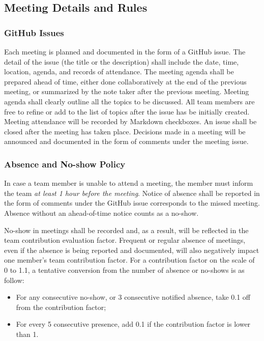 \documentclass{article}
\begin{document}
\subsection{Meeting Details and Rules}

\subsubsection{GitHub Issues}

Each meeting is planned and documented in the form of a GitHub issue. The detail
of the issue (the title or the description) shall include the date, time,
location, agenda, and records of attendance. The meeting agenda shall be
prepared ahead of time, either done collaboratively at the end of the previous
meeting, or summarized by the note taker after the previous meeting. Meeting
agenda shall clearly outline all the topics to be discussed. All team members
are free to refine or add to the list of topics after the issue has be initially
created. Meeting attendance will be recorded by Markdown checkboxes. An issue
shall be closed after the meeting has taken place. Decisions made in a meeting
will be announced and documented in the form of comments under the meeting
issue.

\subsubsection{Absence and No-show Policy}

In case a team member is unable to attend a meeting, the member must inform the
team \emph{at least 1 hour before the meeting}. Notice of absence shall be
reported in the form of comments under the GitHub issue corresponds to the
missed meeting. Absence without an ahead-of-time notice counts as a no-show.

No-show in meetings shall be recorded and, as a result, will be reflected in the
team contribution evaluation factor. Frequent or regular absence of meetings,
even if the absence is being reported and documented, will also negatively
impact one member's team contribution factor. For a contribution factor on the
scale of 0 to 1.1, a tentative conversion from the number of absence or no-shows
is as follow:
\begin{itemize}
\item For any consecutive no-show, or 3 consecutive notified absence, take 0.1 off
  from the contribution factor;
\item For every 5 consecutive presence, add 0.1 if the contribution factor is lower
  than 1.
\end{itemize}
\end{document}
